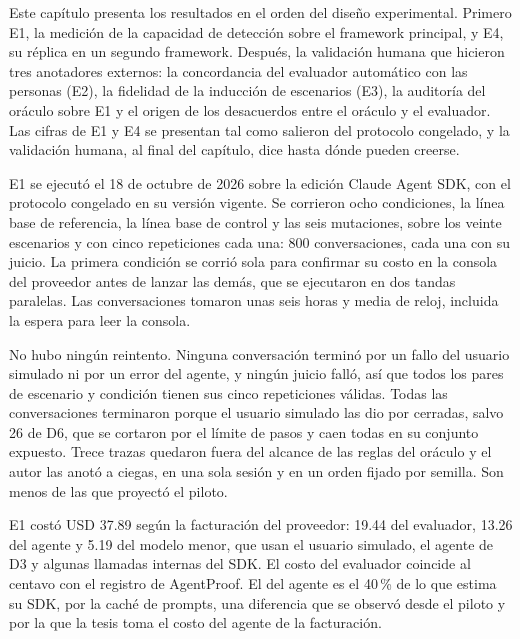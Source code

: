 \clearpage
\blank
{}
\begingroup\dobleesp
\vspace{6pt}
Este capítulo presenta los resultados en el orden del diseño experimental. Primero E1, la medición de la capacidad de detección sobre el framework principal, y E4, su réplica en un segundo framework. Después, la validación humana que hicieron tres anotadores externos: la concordancia del evaluador automático con las personas (E2), la fidelidad de la inducción de escenarios (E3), la auditoría del oráculo sobre E1 y el origen de los desacuerdos entre el oráculo y el evaluador. Las cifras de E1 y E4 se presentan tal como salieron del protocolo congelado, y la validación humana, al final del capítulo, dice hasta dónde pueden creerse.
\par

E1 se ejecutó el 18 de octubre de 2026 sobre la edición Claude Agent SDK, con el protocolo congelado en su versión vigente. Se corrieron ocho condiciones, la línea base de referencia, la línea base de control y las seis mutaciones, sobre los veinte escenarios y con cinco repeticiones cada una: 800 conversaciones, cada una con su juicio. La primera condición se corrió sola para confirmar su costo en la consola del proveedor antes de lanzar las demás, que se ejecutaron en dos tandas paralelas. Las conversaciones tomaron unas seis horas y media de reloj, incluida la espera para leer la consola.
\par
No hubo ningún reintento. Ninguna conversación terminó por un fallo del usuario simulado ni por un error del agente, y ningún juicio falló, así que todos los pares de escenario y condición tienen sus cinco repeticiones válidas. Todas las conversaciones terminaron porque el usuario simulado las dio por cerradas, salvo 26 de D6, que se cortaron por el límite de pasos y caen todas en su conjunto expuesto. Trece trazas quedaron fuera del alcance de las reglas del oráculo y el autor las anotó a ciegas, en una sola sesión y en un orden fijado por semilla. Son menos de las que proyectó el piloto.
\par
E1 costó USD 37.89 según la facturación del proveedor: 19.44 del evaluador, 13.26 del agente y 5.19 del modelo menor, que usan el usuario simulado, el agente de D3 y algunas llamadas internas del SDK. El costo del evaluador coincide al centavo con el registro de AgentProof. El del agente es el 40\,\% de lo que estima su SDK, por la caché de prompts, una diferencia que se observó desde el piloto y por la que la tesis toma el costo del agente de la facturación.
\par

